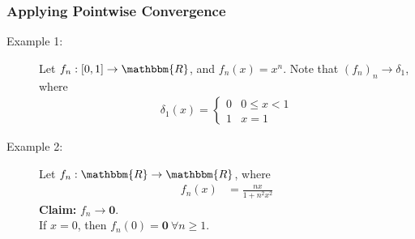 \documentclass[10pt]{extarticle}
\renewcommand{\mathbf}[1]{\mathbold{#1}}
\newcommand{\R}{\mathbbm{R}}
\begin{document}
    \subsubsection{Applying Pointwise Convergence}%
    \begin{description}
      \item[Example 1:] Let $f_n: [0,1]\rightarrow\R$, and $f_n(x) = x^n$. Note that $(f_n)_n\rightarrow \delta_1$, where
        \begin{align*}
          \delta_1(x) = \begin{cases}
            0&0\leq x < 1\\
            1&x = 1
          \end{cases}
        \end{align*}
      \item[Example 2:] Let $f_n: \R \rightarrow \R$, where
        \begin{align*}
          f_n(x) &= \frac{nx}{1 + n^2x^2}
        \end{align*}
        \textbf{Claim:} $f_n \rightarrow \mathbf{0}$.\\

        If $x = 0$, then $f_n(0) = \mathbf{0}~\forall n\geq 1$.\\


\end{description}
\end{document}
